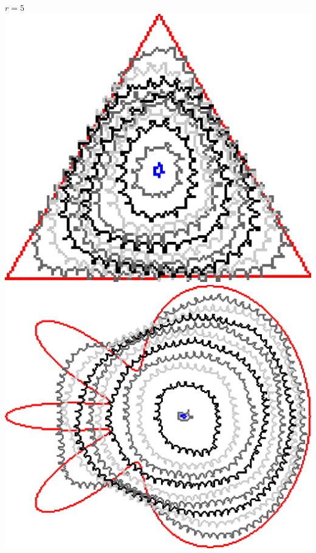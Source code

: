 \begin{frame}
\begin{minipage}{0.49\textwidth}
\end{minipage}
\begin{minipage}{0.49\textwidth}
\center
$r=5$\\
\includegraphics[scale=0.2]{figures/non-submodular-elastica/radius-effect/triangle-r5.png}\\[1em]
\includegraphics[scale=0.2]{figures/non-submodular-elastica/radius-effect/flower-r5.png}
\end{minipage}
\end{frame}

